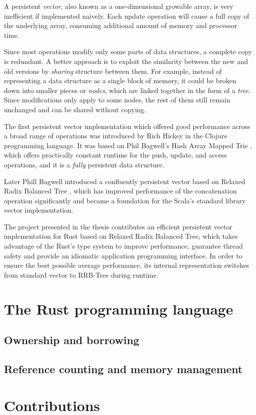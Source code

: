 A persistent \emph{vector}, also known as a one-dimensional growable array, is very inefficient if implemented naively. Each update operation will cause a full copy of the underlying array, consuming additional amount of memory and processor time. 

Since most operations modify only some parts of data structures, a complete copy is redundant. A better approach is to exploit the similarity between the new and old versions by \emph{sharing} structure between them. For example, instead of representing a data structure as a single block of memory, it could be broken down into smaller pieces or \emph{nodes}, which are linked together in the form of a \emph{tree}. Since modifications only apply to some nodes, the rest of them still remain unchanged and can be shared without copying. 

The first persistent vector implementation which offered good performance across a broad range of operations was introduced by Rich Hickey in the Clojure programming language. It was based on Phil Bagwell's Hash Array Mapped Trie \cite{ideal-hash-trees}, which offers practically constant runtime for the push, update, and access operations, and it is a \emph{fully} persistent data structure. 

Later Phill Bagwell introduced a confluently persistent vector based on Relaxed Radix Balanced Tree \cite{efficient-immutable-vectors}, which has improved performance of the concatenation operation significantly and became a foundation for the Scala's standard library vector implementation. 

The project presented in the thesis contributes an efficient persistent vector implementation for Rust based on Relaxed Radix Balanced Tree, which takes advantage of the Rust's type system to improve performance, guarantee thread safety and provide an idiomatic application programming interface. In order to ensure the best possible average performance, its internal representation switches from standard vector to RRB-Tree during runtime. 

\section{The Rust programming language}

\subsection{Ownership and borrowing}

\subsection{Reference counting and memory management}

\section{Contributions}
